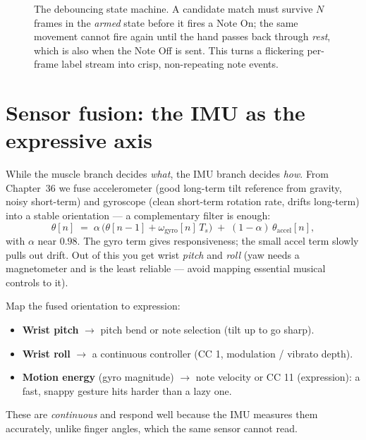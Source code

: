 \begin{figure}[H]
\centering
{}
\caption{The debouncing state machine. A candidate match must survive $N$ frames
in the \emph{armed} state before it fires a Note On; the same movement cannot
fire again until the hand passes back through \emph{rest}, which is also when the
Note Off is sent. This turns a flickering per-frame label stream into crisp,
non-repeating note events.}
\label{ch41:fig-statemachine}
\end{figure}

\section{Sensor fusion: the IMU as the expressive axis}
\label{ch41:fusion}

While the muscle branch decides \emph{what}, the IMU branch decides \emph{how}.
From Chapter~36 we fuse accelerometer (good long-term tilt reference from
gravity, noisy short-term) and gyroscope (clean short-term rotation rate, drifts
long-term) into a stable orientation --- a complementary filter is enough:
\[
  \theta[n] \;=\; \alpha\,\bigl(\theta[n-1] + \omega_{\text{gyro}}[n]\,T_s\bigr)
              \;+\; (1-\alpha)\,\theta_{\text{accel}}[n],
\]
with $\alpha$ near $0.98$. The gyro term gives responsiveness; the small accel
term slowly pulls out drift. Out of this you get wrist \emph{pitch} and
\emph{roll} (yaw needs a magnetometer and is the least reliable --- avoid mapping
essential musical controls to it).

\begin{goalbox}
Map the fused orientation to expression:
\begin{itemize}
  \item \textbf{Wrist pitch} $\to$ pitch bend or note selection (tilt up to go
        sharp).
  \item \textbf{Wrist roll} $\to$ a continuous controller (CC 1, modulation /
        vibrato depth).
  \item \textbf{Motion energy} (gyro magnitude) $\to$ note velocity or CC 11
        (expression): a fast, snappy gesture hits harder than a lazy one.
\end{itemize}
These are \emph{continuous} and respond well because the IMU measures them
accurately, unlike finger angles, which the same sensor cannot read.
\end{goalbox}

